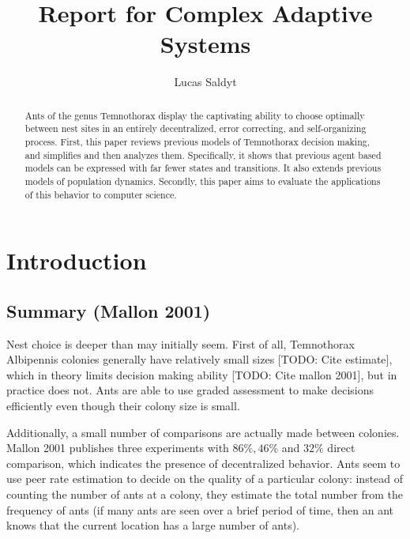 \documentclass[letterpaper]{article}
\title{Report for Complex Adaptive Systems}
\author{Lucas Saldyt}
\begin{document}
\maketitle

\begin{abstract}
    Ants of the genus Temnothorax display the captivating ability to choose optimally between nest sites in an entirely decentralized, error correcting, and self-organizing process.
    First, this paper reviews previous models of Temnothorax decision making, and simplifies and then analyzes them.
    Specifically, it shows that previous agent based models can be expressed with far fewer states and transitions. 
    It also extends previous models of population dynamics.
    Secondly, this paper aims to evaluate the applications of this behavior to computer science.
\end{abstract}

\section{Introduction}


\subsection{Summary (Mallon 2001)}

Nest choice is deeper than may initially seem.
First of all, Temnothorax Albipennis colonies generally have relatively small sizes [TODO: Cite estimate], which in theory limits decision making ability [TODO: Cite mallon 2001], but in practice does not. 
Ants are able to use graded assessment to make decisions efficiently even though their colony size is small.

Additionally, a small number of comparisons are actually made between colonies. 
Mallon 2001 publishes three experiments with $86\%, 46\%$ and $32\%$ direct comparison, which indicates the presence of decentralized behavior.
Ants seem to use peer rate estimation to decide on the quality of a particular colony: instead of counting the number of ants at a colony, they estimate the total number from the frequency of ants (if many ants are seen over a brief period of time, then an ant knows that the current location has a large number of ants).
\end{document}
